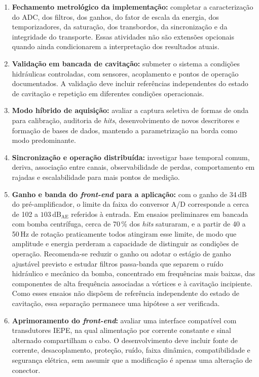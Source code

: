 \begin{enumerate}
	\item \textbf{Fechamento metrológico da implementação:} completar a caracterização do ADC, dos filtros, dos ganhos, do fator de escala da energia, dos temporizadores, da saturação, dos transbordos, da sincronização e da integridade do transporte. Essas atividades não são extensões opcionais quando ainda condicionarem a interpretação dos resultados atuais.
	
	\item \textbf{Validação em bancada de cavitação:} submeter o sistema a condições hidráulicas controladas, com sensores, acoplamento e pontos de operação documentados. A validação deve incluir referências independentes do estado de cavitação e repetição em diferentes condições operacionais.
	
	\item \textbf{Modo híbrido de aquisição:} avaliar a captura seletiva de formas de onda para calibração, auditoria de \textit{hits}, desenvolvimento de novos descritores e formação de bases de dados, mantendo a parametrização na borda como modo predominante.
	
	\item \textbf{Sincronização e operação distribuída:} investigar base temporal comum, deriva, associação entre canais, observabilidade de perdas, comportamento em rajadas e escalabilidade para mais pontos de medição.
	
	\item \textbf{Ganho e banda do \textit{front-end} para a aplicação:} com o ganho de 34\,dB do pré-amplificador, o limite da faixa do conversor A/D corresponde a cerca de 102 a \(103\,\mathrm{dB}_{\mathrm{AE}}\) referidos à entrada. Em ensaios preliminares em bancada com bomba centrífuga, cerca de 70\,\% dos \textit{hits} saturaram, e a partir de 40 a 50\,Hz de rotação praticamente todos atingiram esse limite, de modo que amplitude e energia perderam a capacidade de distinguir as condições de operação. Recomenda-se reduzir o ganho ou adotar o estágio de ganho ajustável previsto e estudar filtros passa-banda que separem o ruído hidráulico e mecânico da bomba, concentrado em frequências mais baixas, das componentes de alta frequência associadas a vórtices e à cavitação incipiente. Como esses ensaios não dispõem de referência independente do estado de cavitação, essa separação permanece uma hipótese a ser verificada.

	\item \textbf{Aprimoramento do \textit{front-end}:} avaliar uma interface compatível com transdutores IEPE, na qual alimentação por corrente constante e sinal alternado compartilham o cabo. O desenvolvimento deve incluir fonte de corrente, desacoplamento, proteção, ruído, faixa dinâmica, compatibilidade e segurança elétrica, sem assumir que a modificação é apenas uma alteração de conector.
	

\end{enumerate}
